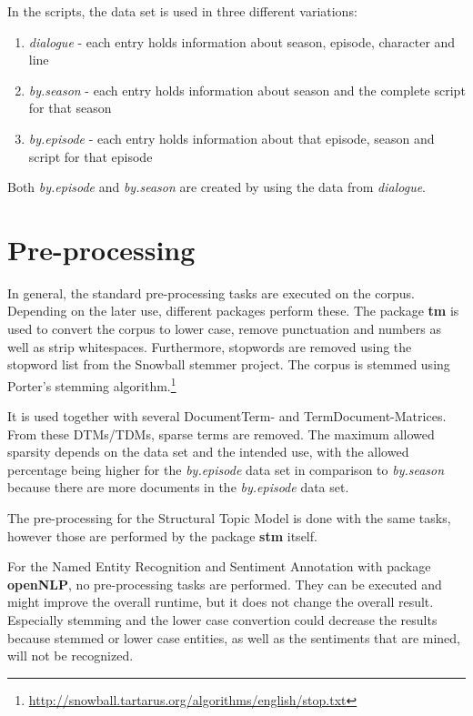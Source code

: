 \documentclass[10pt,a4paper]{article}
\begin{document}
	 In the scripts, the data set is used in three different variations:
	 \begin{enumerate}
	 \item \textit{dialogue} - each entry holds information about season, episode, character and line
	 \item \textit{by.season} - each entry holds information about season and the complete script for that season
	 \item \textit{by.episode} - each entry holds information about that episode, season and script for that episode
	 \end{enumerate}
	 
	 Both \textit{by.episode} and \textit{by.season} are created by using the data from \textit{dialogue}.
	
	
	
	
	\section{Pre-processing}
	In general, the standard pre-processing tasks are executed on the corpus. Depending on the later use, different packages perform these.
	The package \textbf{tm} is used to convert the corpus to lower case, remove punctuation and numbers as well as strip whitespaces. Furthermore, stopwords are removed using the stopword list from the Snowball stemmer project. The corpus is stemmed using Porter's stemming algorithm.\footnote{\url{http://snowball.tartarus.org/algorithms/english/stop.txt}}
	
	 It is used together with several DocumentTerm- and TermDocument-Matrices. From these DTMs/TDMs, sparse terms are removed. The maximum allowed sparsity depends on the data set and the intended use, with the allowed percentage being higher for the \textit{by.episode} data set in comparison to \textit{by.season} because there are more documents in the \textit{by.episode} data set. 
	
	The pre-processing for the Structural Topic Model is done with the same tasks, however those are performed by the package \textbf{stm} itself.
	
	For the Named Entity Recognition and Sentiment Annotation with package \textbf{openNLP}, no pre-processing tasks are performed. They can be executed and might improve the overall runtime, but it does not change the overall result. Especially stemming and the lower case convertion could decrease the results because stemmed or lower case entities, as well as the sentiments that are mined, will not be recognized.
\end{document}
